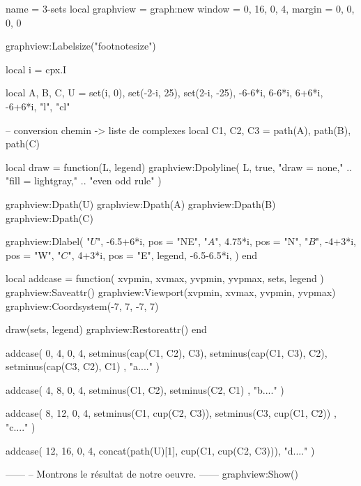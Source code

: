 \documentclass{standalone}
\begin{document}
\begin{luadraw}{name = 3-sets}
local graphview = graph:new{
  window = {0, 16, 0, 4},
  margin = {0, 0, 0, 0}
}

graphview:Labelsize("footnotesize")

local i = cpx.I

local A, B, C, U = set(i, 0), set(-2-i, 25), set(2-i, -25), {-6-6*i, 6-6*i, 6+6*i, -6+6*i, "l", "cl"}

-- conversion chemin -> liste de complexes
local C1, C2, C3 = path(A), path(B), path(C)

local draw = function(L, legend)
  graphview:Dpolyline(
    L,
    true,
       "draw = none,"
    .. "fill = lightgray,"
    .. "even odd rule"
  )

  graphview:Dpath(U)
  graphview:Dpath(A)
  graphview:Dpath(B)
  graphview:Dpath(C)

  graphview:Dlabel(
    "$U$", -6.5+6*i, {pos = "NE"},
    "$A$", 4.75*i, {pos = "N"},
    "$B$", -4+3*i, {pos = "W"},
    "$C$", 4+3*i, {pos = "E"},
    legend, -6.5-6.5*i, {}
  )
end

local addcase = function(
    xvpmin, xvmax, yvpmin, yvpmax,
    sets,
    legend
)
  graphview:Saveattr()
    graphview:Viewport(xvpmin, xvmax, yvpmin, yvpmax)
    graphview:Coordsystem(-7, 7, -7, 7)

    draw(sets, legend)
  graphview:Restoreattr()
end

addcase(
  0, 4, 0, 4,
  {
    setminus(cap(C1, C2), C3),
    setminus(cap(C1, C3), C2),
    setminus(cap(C3, C2), C1)
  },
  "a...."
)

addcase(
  4, 8, 0, 4,
  {
    setminus(C1, C2),
    setminus(C2, C1)
  },
  "b...."
)

addcase(
  8, 12, 0, 4,
  {
    setminus(C1, cup(C2, C3)),
    setminus(C3, cup(C1, C2))
  },
  "c...."
)

addcase(
  12, 16, 0, 4,
  concat(path(U)[1], cup(C1, cup(C2, C3))),
  "d...."
)

------
-- Montrons le résultat de notre oeuvre.
------
graphview:Show()
\end{luadraw}
\end{document}

